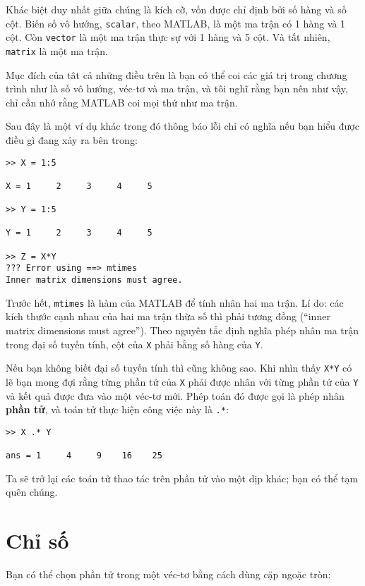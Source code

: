 \documentclass[12pt]{book}
\begin{document}
Khác biệt duy nhất giữa chúng là kích cỡ, vốn được chỉ định
bởi số hàng và số cột. Biến số vô hướng, {\tt scalar}, theo
MATLAB, là một ma trận có 1 hàng và 1 cột.  Còn {\tt vector} là
một ma trận thực sự với 1 hàng và 5 cột. Và tất nhiên, 
{\tt matrix} là một ma trận.

Mục đích của tât cả những điều trên là bạn có thể coi các 
giá trị trong chương trình như là số vô hướng, véc-tơ và ma trận,
và tôi nghĩ rằng bạn nên như vậy, chỉ cần nhớ rằng MATLAB
coi mọi thứ như ma trận.

Sau đây là một ví dụ khác trong đó thông báo lỗi chỉ có nghĩa
nếu bạn hiểu được điều gì đang xảy ra bên trong:

\begin{verbatim}
>> X = 1:5

X = 1     2     3     4     5

>> Y = 1:5

Y = 1     2     3     4     5

>> Z = X*Y
??? Error using ==> mtimes
Inner matrix dimensions must agree.
\end{verbatim}

Trước hết, {\tt mtimes} là hàm của MATLAB để tính nhân hai
ma trận. Lí do: các kích thước cạnh nhau của hai ma trận
thừa số thì phải tương đồng (``inner matrix dimensions
must agree''). Theo nguyên tắc định nghĩa phép nhân ma trận
trong đại số tuyến tính, cột của {\tt X} phải bằng số hàng
của {\tt Y}.

Nếu bạn không biết đại số tuyến tính thì cũng không sao. Khi 
nhìn thấy {\tt X*Y} có lẽ bạn mong đợi rằng từng phần tử của
{\tt X} phải được nhân với từng phần tử của 
{\tt Y} và kết quả được đưa vào một véc-tơ mới. Phép toán đó
được gọi là phép nhân {\bf phần tử}, và toán tử thực hiện
công việc này là {\tt .*}:

\begin{verbatim}
>> X .* Y

ans = 1     4     9    16    25
\end{verbatim}

Ta sẽ trở lại các toán tử thao tác trên phần tử vào một dịp
khác; bạn có thể tạm quên chúng.




\section{Chỉ số}

Bạn có thể chọn phần tử trong một véc-tơ bằng cách dùng
cặp ngoặc tròn:
\end{document}
